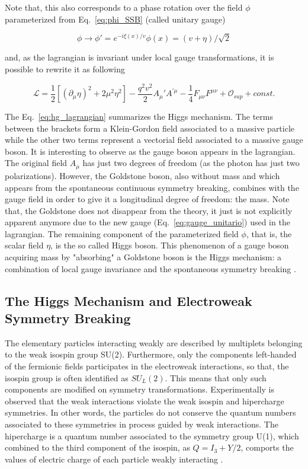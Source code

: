 Note that, this also corresponds to a phase rotation over the field $\phi$ parameterized from Eq.~\ref{eq:phi_SSB} (called unitary gauge)

\begin{equation}
\phi \rightarrow \phi' = e^{-i\xi(x)/v}\phi(x) = (v + \eta)/ \sqrt{2}
\label{eq:gauge_unitario}
\end{equation}

and, as the lagrangian is invariant under local gauge transformations, it is possible to rewrite it as following 

\begin{equation}
\mathcal{L} = \dfrac{1}{2}[(\partial_{\mu}\eta)^2 + 2\mu^2\eta^2] - \dfrac{q^2v^2}{2}A_{\mu}'A^{'\mu} - \dfrac{1}{4}F_{\mu\nu}F^{\mu\nu} + \mathcal{O}_{sup} + const.
\label{eq:hg_lagrangian}
\end{equation}

The Eq.~\ref{eq:hg_lagrangian} summarizes the Higgs mechanism. The terms between the brackets form a Klein-Gordon field associated to a massive particle while the other two terms represent a vectorial field associated to a massive gauge boson. It is interesting to observe as the gauge boson appears in the lagrangian. The original field $A_{\mu}$ has just two degrees of freedom (as the photon has just two polarizations). However, the Goldstone boson, also without mass and which appears from the spontaneous continuous symmetry breaking, combines with the gauge field in order to give it a longitudinal degree of freedom: the mass. Note that, the Goldstone does not disappear from the theory, it just is not explicitly apparent anymore due to the new gauge (Eq.~\ref{eq:gauge_unitario}) used in the lagrangian. The remaining component of the parameterized field $\phi$, that is, the scalar field $\eta$, is the so called Higgs boson. This phenomenon of a gauge boson acquiring mass by "absorbing" a Goldstone boson is the Higgs mechanism: a combination of local gauge invariance and the spontaneous symmetry breaking \cite{bib:griffiths-2008,bib:halzen-martin-1984,bib:quigg-1983,bib:das-2008}.


\subsection{The Higgs Mechanism and Electroweak Symmetry Breaking}
The elementary particles interacting weakly are described by multiplets belonging to the weak isospin group SU(2). Furthermore, only the components left-handed of the fermionic fields participates in the electroweak interactions, so that, the isospin group is often identified as $SU_{L}(2)$. This means that only such components are modified on symmetry transformations. Experimentally is observed that the weak interactions violate the weak isospin and hipercharge symmetries. In other words, the particles do not conserve the quantum numbers associated to these symmetries in process guided by weak interactions. The hipercharge is a quantum number associated to the symmetry group U(1), which combined to the third component of the isospin, as $Q = I_3 + Y/2$, comports the values of electric charge of each particle weakly interacting \cite{bib:das-2008,bib:seiden-2008}. 

